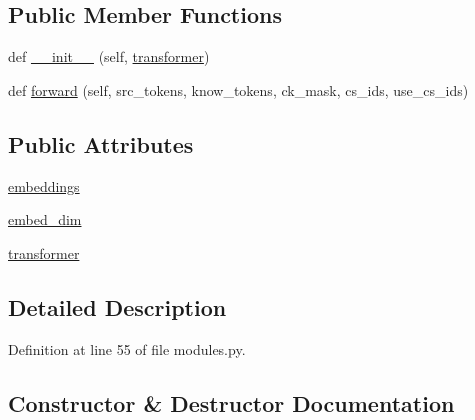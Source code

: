 \subsection*{Public Member Functions}
\begin{DoxyCompactItemize}
\item 
def \hyperlink{classgenerator_1_1modules_1_1ContextKnowledgeEncoder_af3314218e3107ed62bb188c66fd9a91d}{\+\_\+\+\_\+init\+\_\+\+\_\+} (self, \hyperlink{classgenerator_1_1modules_1_1ContextKnowledgeEncoder_ac2e37a1a1e66ec7eeb00a65075dc14cf}{transformer})
\item 
def \hyperlink{classgenerator_1_1modules_1_1ContextKnowledgeEncoder_a131ee3cac93f38e5b5503ca43e62cf55}{forward} (self, src\+\_\+tokens, know\+\_\+tokens, ck\+\_\+mask, cs\+\_\+ids, use\+\_\+cs\+\_\+ids)
\end{DoxyCompactItemize}
\subsection*{Public Attributes}
\begin{DoxyCompactItemize}
\item 
\hyperlink{classgenerator_1_1modules_1_1ContextKnowledgeEncoder_a0d864b6bf2c7a983760ebb5ff29f20a4}{embeddings}
\item 
\hyperlink{classgenerator_1_1modules_1_1ContextKnowledgeEncoder_aaff127b3e981c6d851692040a4d4665f}{embed\+\_\+dim}
\item 
\hyperlink{classgenerator_1_1modules_1_1ContextKnowledgeEncoder_ac2e37a1a1e66ec7eeb00a65075dc14cf}{transformer}
\end{DoxyCompactItemize}


\subsection{Detailed Description}


Definition at line 55 of file modules.\+py.



\subsection{Constructor \& Destructor Documentation}
\mbox{\label{classgenerator_1_1modules_1_1ContextKnowledgeEncoder_af3314218e3107ed62bb188c66fd9a91d}} 
